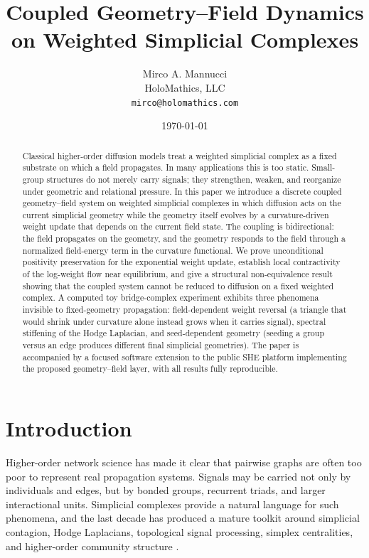 \documentclass[11pt]{article}
\title{Coupled Geometry--Field Dynamics on Weighted Simplicial Complexes}
\author{Mirco A. Mannucci\\HoloMathics, LLC\\\texttt{mirco@holomathics.com}}
\date{\today}
\begin{document}
\maketitle

\begin{abstract}
Classical higher-order diffusion models treat a weighted simplicial complex as a fixed substrate on which a field propagates. In many applications this is too static. Small-group structures do not merely carry signals; they strengthen, weaken, and reorganize under geometric and relational pressure. In this paper we introduce a discrete coupled geometry--field system on weighted simplicial complexes in which diffusion acts on the current simplicial geometry while the geometry itself evolves by a curvature-driven weight update that depends on the current field state. The coupling is bidirectional: the field propagates on the geometry, and the geometry responds to the field through a normalized field-energy term in the curvature functional. We prove unconditional positivity preservation for the exponential weight update, establish local contractivity of the log-weight flow near equilibrium, and give a structural non-equivalence result showing that the coupled system cannot be reduced to diffusion on a fixed weighted complex. A computed toy bridge-complex experiment exhibits three phenomena invisible to fixed-geometry propagation: field-dependent weight reversal (a triangle that would shrink under curvature alone instead grows when it carries signal), spectral stiffening of the Hodge Laplacian, and seed-dependent geometry (seeding a group versus an edge produces different final simplicial geometries). The paper is accompanied by a focused software extension to the public SHE platform implementing the proposed geometry--field layer, with all results fully reproducible.
\end{abstract}

\section{Introduction}

Higher-order network science has made it clear that pairwise graphs are often too poor to represent real propagation systems. Signals may be carried not only by individuals and edges, but by bonded groups, recurrent triads, and larger interactional units. Simplicial complexes provide a natural language for such phenomena, and the last decade has produced a mature toolkit around simplicial contagion, Hodge Laplacians, topological signal processing, simplex centralities, and higher-order community structure \cite{IacopiniPetriBarratLatora2019,BattistonCencettiIacopiniEtAl2020,BarbarossaSardellitti2020,TorresBianconi2020,BacciniGeraciBianconi2022,BickGrossHarringtonSchaub2023}.
\end{document}
